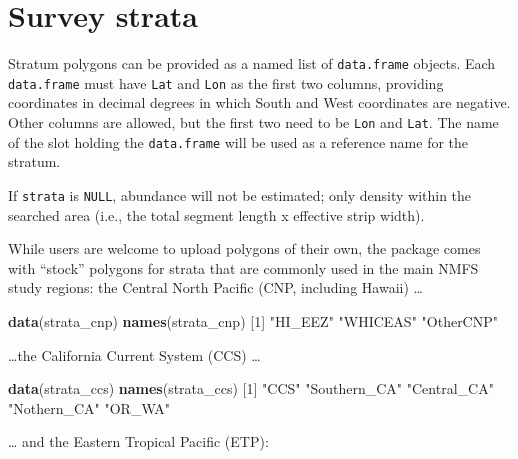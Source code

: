 \documentclass[
]{book}
\newenvironment{Shaded}{\begin{snugshade}}{\end{snugshade}}
\newcommand{\DecValTok}[1]{\textcolor[rgb]{0.00,0.00,0.81}{#1}}
\newcommand{\KeywordTok}[1]{\textcolor[rgb]{0.13,0.29,0.53}{\textbf{#1}}}
\newcommand{\NormalTok}[1]{#1}
\newcommand{\StringTok}[1]{\textcolor[rgb]{0.31,0.60,0.02}{#1}}
\begin{document}
\hypertarget{survey-strata}{%
\section*{Survey strata}\label{survey-strata}}

Stratum polygons can be provided as a named list of \texttt{data.frame} objects. Each \texttt{data.frame} must have \texttt{Lat} and \texttt{Lon} as the first two columns, providing coordinates in decimal degrees in which South and West coordinates are negative. Other columns are allowed, but the first two need to be \texttt{Lon} and \texttt{Lat}. The name of the slot holding the \texttt{data.frame} will be used as a reference name for the stratum.

If \texttt{strata} is \texttt{NULL}, abundance will not be estimated; only density within the searched area (i.e., the total segment length x effective strip width).

While users are welcome to upload polygons of their own, the package comes with ``stock'' polygons for strata that are commonly used in the main NMFS study regions: the Central North Pacific (CNP, including Hawaii) \ldots{}

\begin{Shaded}
\begin{Highlighting}[]
\KeywordTok{data}\NormalTok{(strata_cnp) }
\KeywordTok{names}\NormalTok{(strata_cnp)}
\NormalTok{[}\DecValTok{1}\NormalTok{] }\StringTok{"HI_EEZ"}   \StringTok{"WHICEAS"}  \StringTok{"OtherCNP"}
\end{Highlighting}
\end{Shaded}

\ldots the California Current System (CCS) \ldots{}

\begin{Shaded}
\begin{Highlighting}[]
\KeywordTok{data}\NormalTok{(strata_ccs) }
\KeywordTok{names}\NormalTok{(strata_ccs)}
\NormalTok{[}\DecValTok{1}\NormalTok{] }\StringTok{"CCS"}         \StringTok{"Southern_CA"} \StringTok{"Central_CA"}  \StringTok{"Nothern_CA"}  \StringTok{"OR_WA"}      
\end{Highlighting}
\end{Shaded}

\ldots{} and the Eastern Tropical Pacific (ETP):
\end{document}

